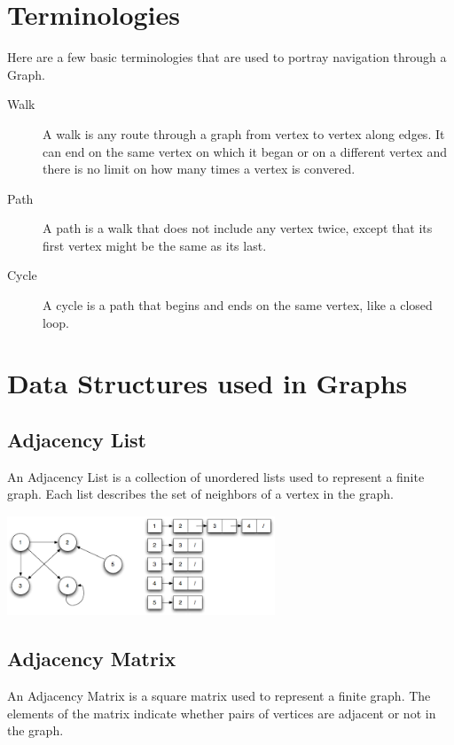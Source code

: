 \documentclass[11pt,a4paper]{extarticle}
\begin{document}
\section{Terminologies}
Here are a few basic terminologies that are used to portray navigation through a Graph. \\
\begin{adjustwidth}{1.5em}{0pt}
\begin{description}
\item [Walk] A walk is any route through a graph from vertex to vertex along edges. It can end on the same vertex on which it began or on a different vertex and there is no limit on how many times a vertex is convered.
\item [Path] A path is a walk that does not include any vertex twice, except that its first vertex might be the same as its last.
\item [Cycle] A cycle is a path that begins and ends on the same vertex, like a closed loop.
\end{description}
\end{adjustwidth}

\section{Data Structures used in Graphs}
\subsection{Adjacency List}
An Adjacency List is a collection of unordered lists used to represent a finite graph. Each list describes the set of neighbors of a vertex in the graph.

\begin{center}
	\includegraphics[width=8cm, height=3cm]{list}
\end{center} 

\subsection{Adjacency Matrix}
An Adjacency Matrix is a square matrix used to represent a finite graph. The elements of the matrix indicate whether pairs of vertices are adjacent or not in the graph.
\end{document}
